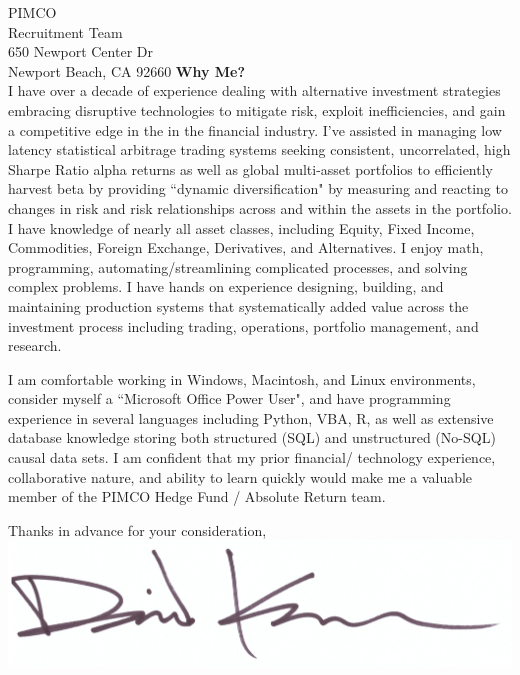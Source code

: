 \documentclass{letter}
\begin{document}
\begin{letter}{
  PIMCO \\
  Recruitment Team \\
  650 Newport Center Dr \\
  Newport Beach, CA 92660
}
\textbf{Why Me?} \\
I have over a decade of experience dealing with alternative investment strategies
embracing disruptive technologies to mitigate risk, exploit inefficiencies, and gain
a competitive edge in the in the financial industry.
I've assisted in managing low latency statistical arbitrage trading systems seeking
consistent, uncorrelated, high Sharpe Ratio alpha returns as well as global multi-asset
portfolios to efficiently harvest beta by providing ``dynamic diversification" by
measuring and reacting to changes in risk and risk relationships across and within
the assets in the portfolio. I have knowledge of nearly all asset classes, including
Equity, Fixed Income, Commodities, Foreign Exchange, Derivatives, and Alternatives.
I enjoy math, programming, automating/streamlining complicated processes, and
solving complex problems. I have hands on
experience designing, building, and maintaining production systems that systematically
added value across the investment process including trading, operations, portfolio
management, and research. 

\newpage

I am comfortable working in
Windows, Macintosh, and Linux environments, consider myself a ``Microsoft Office
Power User", and have programming experience in several languages including Python,
VBA, R, as well as extensive database knowledge storing both structured (SQL)
and unstructured (No-SQL) causal data sets. I am confident that my prior financial/
technology experience, collaborative nature, and ability to learn quickly would
make me a valuable member of the PIMCO Hedge Fund / Absolute Return team. \\


\closing{
  Thanks in advance for your consideration, \\
  \vspace{.33in}
  \includegraphics[scale=0.33]{signature.png}
}

\end{letter}
\end{document}
